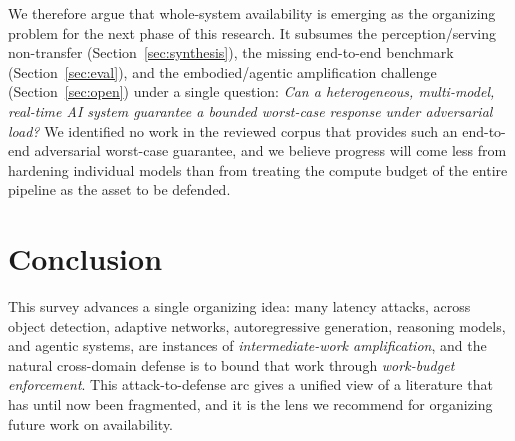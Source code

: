 \documentclass[acmsmall,screen,review,nonacm]{acmart}
\begin{document}
We therefore argue that whole-system availability is emerging as the organizing problem for the next phase of this research. It subsumes the perception/serving non-transfer (Section~\ref{sec:synthesis}), the missing end-to-end benchmark (Section~\ref{sec:eval}), and the embodied/agentic amplification challenge (Section~\ref{sec:open}) under a single question: \emph{Can a heterogeneous, multi-model, real-time AI system guarantee a bounded worst-case response under adversarial load?} We identified no work in the reviewed corpus that provides such an end-to-end adversarial worst-case guarantee, and we believe progress will come less from hardening individual models than from treating the compute budget of the entire pipeline as the asset to be defended.


\section{Conclusion}
\label{sec:conclusion}
This survey advances a single organizing idea: many latency attacks, across object detection, adaptive networks, autoregressive generation, reasoning models, and agentic systems, are instances of \emph{intermediate-work amplification}, and the natural cross-domain defense is to bound that work through \emph{work-budget enforcement}. This attack-to-defense arc gives a unified view of a literature that has until now been fragmented, and it is the lens we recommend for organizing future work on availability.
\end{document}
